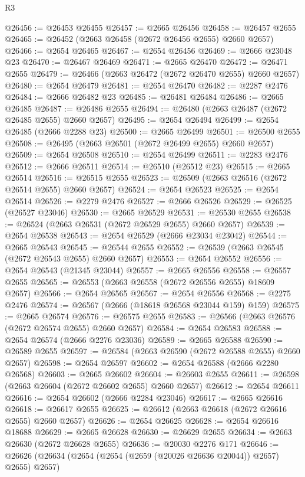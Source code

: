 \begin{lexlean}{R3}
\begin{coremodule}
@26456 := @26453 @26455
@26457 := @2665 @26456
@26458 := @26457 @2655
@26465 := @26452 (@2663 @26458 (@2672 @26456 @2655) @2660 @2657)
@26466 := @2654 @26465
@26467 := @2654 @26456
@26469 := @2666 @23048 @23
@26470 := @26467 @26469
@26471 := @2665 @26470
@26472 := @26471 @2655
@26479 := @26466 (@2663 @26472 (@2672 @26470 @2655) @2660 @2657)
@26480 := @2654 @26479
@26481 := @2654 @26470
@26482 := @2287 @2476
@26484 := @2666 @26482 @23
@26485 := @26481 @26484
@26486 := @2665 @26485
@26487 := @26486 @2655
@26494 := @26480 (@2663 @26487 (@2672 @26485 @2655) @2660 @2657)
@26495 := @2654 @26494
@26499 := @2654 @26485 (@2666 @2288 @23)
@26500 := @2665 @26499
@26501 := @26500 @2655
@26508 := @26495 (@2663 @26501 (@2672 @26499 @2655) @2660 @2657)
@26509 := @2654 @26508
@26510 := @2654 @26499
@26511 := @2283 @2476
@26512 := @2666 @26511
@26514 := @26510 (@26512 @23)
@26515 := @2665 @26514
@26516 := @26515 @2655
@26523 := @26509 (@2663 @26516 (@2672 @26514 @2655) @2660 @2657)
@26524 := @2654 @26523
@26525 := @2654 @26514
@26526 := @2279 @2476
@26527 := @2666 @26526
@26529 := @26525 (@26527 @23046)
@26530 := @2665 @26529
@26531 := @26530 @2655
@26538 := @26524 (@2663 @26531 (@2672 @26529 @2655) @2660 @2657)
@26539 := @2654 @26538
@26543 := @2654 @26529 (@2666 @23034 @23042)
@26544 := @2665 @26543
@26545 := @26544 @2655
@26552 := @26539 (@2663 @26545 (@2672 @26543 @2655) @2660 @2657)
@26553 := @2654 @26552
@26556 := @2654 @26543 (@21345 @23044)
@26557 := @2665 @26556
@26558 := @26557 @2655
@26565 := @26553 (@2663 @26558 (@2672 @26556 @2655) @18609 @2657)
@26566 := @2654 @26565
@26567 := @2654 @26556
@26568 := @2275 @2476
@26574 := @26567 (@2666 (@18618 @26568 @23044 @159) @159)
@26575 := @2665 @26574
@26576 := @26575 @2655
@26583 := @26566 (@2663 @26576 (@2672 @26574 @2655) @2660 @2657)
@26584 := @2654 @26583
@26588 := @2654 @26574 (@2666 @2276 @23036)
@26589 := @2665 @26588
@26590 := @26589 @2655
@26597 := @26584 (@2663 @26590 (@2672 @26588 @2655) @2660 @2657)
@26598 := @2654 @26597
@26602 := @2654 @26588 (@2666 @2280 @26568)
@26603 := @2665 @26602
@26604 := @26603 @2655
@26611 := @26598 (@2663 @26604 (@2672 @26602 @2655) @2660 @2657)
@26612 := @2654 @26611
@26616 := @2654 @26602 (@2666 @2284 @23046)
@26617 := @2665 @26616
@26618 := @26617 @2655
@26625 := @26612 (@2663 @26618 (@2672 @26616 @2655) @2660 @2657)
@26626 := @2654 @26625
@26628 := @2654 @26616 @18688
@26629 := @2665 @26628
@26630 := @26629 @2655
@26634 := @2663 @26630 (@2672 @26628 @2655)
@26636 := @20030 @2276 @171
@26646 := @26626 (@26634 (@2654 (@2654 (@2659 (@20026 @26636 @20044)) @2657) @2655) @2657)

\end{coremodule}
\end{lexlean}
